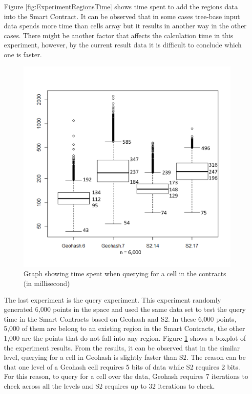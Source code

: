 \npara Figure \ref{fig:ExperimentRegionsTime} shows time spent to add the regions data into the Smart Contract.
It can be observed that in some cases tree-base input data spends more time than cells array but it results in another way in the other cases.
There might be another factor that affects the calculation time in this experiment, however, by the current result data it is difficult to conclude which one is faster.

\begin{figure}[htb!]
  \centering
  \includegraphics[width=\textwidth]{images/ExperimentQuery.png}
  \caption{Graph showing time spent when querying for a cell in the contracts (in millisecond)}
  \label{fig:ExperimentQuery}
\end{figure}

\npara The last experiment is the query experiment.
This experiment randomly generated 6,000 points in the space and used the same data set to test the query time in the Smart Contracts based on Geohash and S2.
In these 6,000 points, 5,000 of them are belong to an existing region in the Smart Contracts, the other 1,000 are the points that do not fall into any region.
Figure \ref{fig:ExperimentQuery} shows a boxplot of the experiment results.
From the results, it can be observed that in the similar level, querying for a cell in Geohash is slightly faster than S2.
The reason can be that one level of a Geohash cell requires 5 bits of data while S2 requires 2 bits.
For this reason, to query for a cell over the data, Geohash requires 7 iterations to check across all the levels and S2 requires up to 32 iterations to check.

